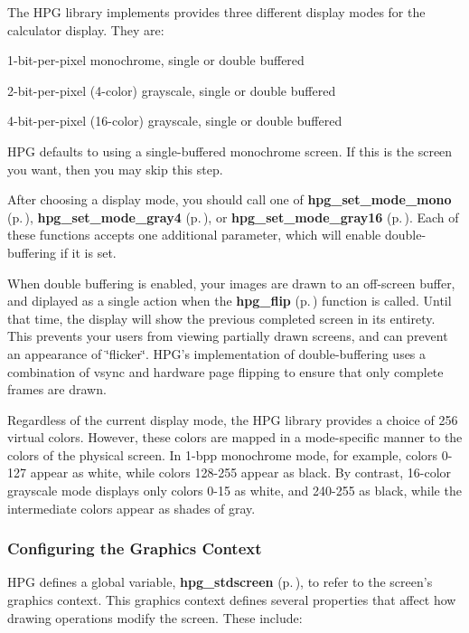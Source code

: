 The HPG library implements provides three different display modes for the calculator display. They are:

\begin{CompactItemize}
\item 
 1-bit-per-pixel monochrome, single or double buffered \item 
 2-bit-per-pixel (4-color) grayscale, single or double buffered \item 
 4-bit-per-pixel (16-color) grayscale, single or double buffered\end{CompactItemize}
HPG defaults to using a single-buffered monochrome screen. If this is the screen you want, then you may skip this step.

After choosing a display mode, you should call one of {\bf hpg\_\-set\_\-mode\_\-mono} {\rm (p.\,\pageref{hpgraphics_8h_a30})}, {\bf hpg\_\-set\_\-mode\_\-gray4} {\rm (p.\,\pageref{hpgraphics_8h_a31})}, or {\bf hpg\_\-set\_\-mode\_\-gray16} {\rm (p.\,\pageref{hpgraphics_8h_a32})}. Each of these functions accepts one additional parameter, which will enable double-buffering if it is set.

When double buffering is enabled, your images are drawn to an off-screen buffer, and diplayed as a single action when the {\bf hpg\_\-flip} {\rm (p.\,\pageref{hpgraphics_8h_a34})} function is called. Until that time, the display will show the previous completed screen in its entirety. This prevents your users from viewing partially drawn screens, and can prevent an appearance of \char`\"{}flicker\char`\"{}. HPG's implementation of double-buffering uses a combination of vsync and hardware page flipping to ensure that only complete frames are drawn.

Regardless of the current display mode, the HPG library provides a choice of 256 virtual colors. However, these colors are mapped in a mode-specific manner to the colors of the physical screen. In 1-bpp monochrome mode, for example, colors 0-127 appear as white, while colors 128-255 appear as black. By contrast, 16-color grayscale mode displays only colors 0-15 as white, and 240-255 as black, while the intermediate colors appear as shades of gray.

\subsubsection{Configuring the Graphics Context}\label{config}


HPG defines a global variable, {\bf hpg\_\-stdscreen} {\rm (p.\,\pageref{hpgraphics_8h_a27})}, to refer to the screen's graphics context. This graphics context defines several properties that affect how drawing operations modify the screen. These include:

